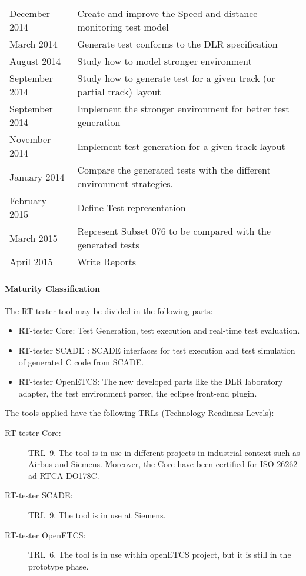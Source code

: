 \begin{tabular}{lp{5cm}}
December 2014 & Create and improve  the Speed and distance monitoring test model\\
March 2014 &  Generate test conforms to the DLR specification\\
August 2014 & Study how to model stronger environment \\
September 2014 & Study how to generate test for a given track (or partial track) layout\\
September 2014 &  Implement the stronger environment for better test generation\\
November 2014 &  Implement test generation for a given track layout\\
January 2014&  Compare the generated tests with the different environment
  strategies.\\
 February 2015 & Define Test representation\\
 March 2015 & Represent Subset 076 to be compared with the
  generated tests\\
April 2015 & Write Reports \\
\end{tabular}

\paragraph{Maturity Classification}
The RT-tester tool may be divided in the following parts:
\begin{itemize}
\item RT-tester Core: Test Generation, test execution and real-time
  test evaluation.
\item RT-tester SCADE : SCADE interfaces for test execution and test
  simulation of generated C code from SCADE.
\item RT-tester OpenETCS: The new developed parts like the DLR
  laboratory adapter, the test environment parser, the eclipse
  front-end plugin.
\end{itemize}
The tools applied have the following TRLs (Technology Readiness
Levels):

\begin{description}
\item[RT-tester Core:] TRL~9. The tool is in use in different
  projects in industrial context such as Airbus  and
  Siemens. Moreover, the Core have been certified for  ISO 26262 ad RTCA
DO178C.
\item[RT-tester SCADE:] TRL~9. The tool is in use at Siemens.
\item[RT-tester OpenETCS:] TRL~6. The tool is in use within
  openETCS project, but it is still in the prototype phase.
\end{description}

